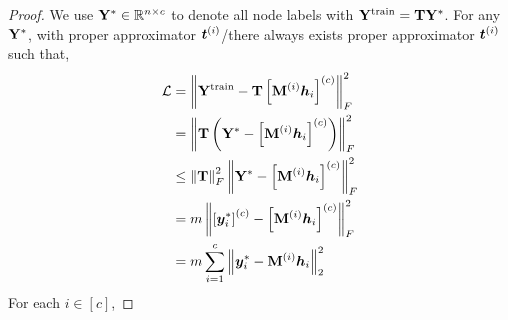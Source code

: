 \documentclass{article} %
\begin{document}
	\begin{proof}
		We use ${\mathbf{Y}}^*\in{\mathbb{R}}^{n\times c}$ to denote all node labels with ${\mathbf{Y}}^{\textrm{train}}={\mathbf{T}}{\mathbf{Y}}^*$.
		For any ${\mathbf{Y}}^*$, with proper approximator ${\bm{t}}^{(i)}$/there always exists proper approximator ${\bm{t}}^{(i)}$ such that,
		\begin{equation}
			\begin{aligned}
				{\mathcal{L}}&=\left\|{\mathbf{Y}}^{\textrm{train}}-{\mathbf{T}}\left[{\mathbf{M}}^{(i)}{\bm{h}}_i\right]^{(c)}\right\|_F^2\\
				&=\left\|{\mathbf{T}}\left({\mathbf{Y}}^*-\left[{\mathbf{M}}^{(i)}{\bm{h}}_i\right]^{(c)}\right)\right\|_F^2\\
				&\leq\left\|{\mathbf{T}}\right\|_F^2\left\|{\mathbf{Y}}^*-\left[{\mathbf{M}}^{(i)}{\bm{h}}_i\right]^{(c)}\right\|_F^2\\
				&=m\left\|\left[{\bm{y}}^*_i\right]^{(c)}-\left[{\mathbf{M}}^{(i)}{\bm{h}}_i\right]^{(c)}\right\|_F^2\\
				&=m\sum_{i=1}^c\left\|{\bm{y}}^*_i-{\mathbf{M}}^{(i)}{\bm{h}}_i\right\|_2^2
			\end{aligned}
		\end{equation}
		For each $i\in[c]$,

\end{proof}
\end{document}
